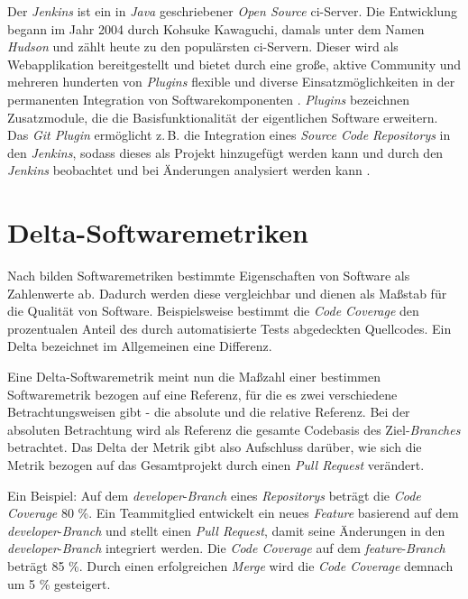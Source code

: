 Der \textit{Jenkins} ist ein in \textit{Java} geschriebener \textit{Open Source} \ac{ci}-Server. Die Entwicklung begann im Jahr 2004 durch Kohsuke Kawaguchi, damals unter dem Namen \textit{Hudson} und zählt heute zu den populärsten \ac{ci}-Servern. Dieser wird als Webapplikation bereitgestellt und bietet durch eine große, aktive Community und mehreren hunderten von \textit{Plugins} flexible und diverse Einsatzmöglichkeiten in der permanenten Integration von Softwarekomponenten \citep{jenkins-guide}. \textit{Plugins} bezeichnen Zusatzmodule, die die Basisfunktionalität der eigentlichen Software erweitern. Das \textit{Git Plugin} ermöglicht z.\,B. die Integration eines \textit{Source Code Repositorys} in den \textit{Jenkins}, sodass dieses als Projekt hinzugefügt werden kann und durch den \textit{Jenkins} beobachtet und bei Änderungen analysiert werden kann \citep{git-plugin}.  

\section{Delta-Softwaremetriken}

Nach \citet{augsten_2019} bilden Softwaremetriken bestimmte Eigenschaften von Software als Zahlenwerte ab. Dadurch werden diese vergleichbar und dienen als Maßstab für die Qualität von Software. Beispielsweise bestimmt die \textit{Code Coverage} den prozentualen Anteil des durch automatisierte Tests abgedeckten Quellcodes. Ein Delta bezeichnet im Allgemeinen eine Differenz. 

Eine Delta-Softwaremetrik meint nun die Maßzahl einer bestimmen Softwaremetrik bezogen auf eine Referenz, für die es zwei verschiedene Betrachtungsweisen gibt - die absolute und die relative Referenz.
Bei der absoluten Betrachtung wird als Referenz die gesamte Codebasis des Ziel-\textit{Branches} betrachtet. Das Delta der Metrik gibt also Aufschluss darüber, wie sich die Metrik bezogen auf das Gesamtprojekt durch einen \textit{Pull Request} verändert. 

Ein Beispiel: Auf dem \textit{developer}-\textit{Branch} eines \textit{Repositorys} beträgt die \textit{Code Coverage} 80 \%. Ein Teammitglied entwickelt ein neues \textit{Feature} basierend auf dem \textit{developer}-\textit{Branch} und stellt einen \textit{Pull Request}, damit seine Änderungen in den \textit{developer}-\textit{Branch} integriert werden. Die \textit{Code Coverage} auf dem \textit{feature}-\textit{Branch} beträgt 85 \%. Durch einen erfolgreichen \textit{Merge} wird die \textit{Code Coverage} demnach um 5 \% gesteigert. 

